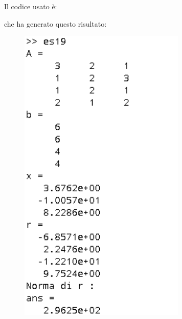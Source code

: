 \label{es319}
\begin{flushleft}
Il codice usato è:

che ha generato questo risultato:
\begin{figure}[h]
\includegraphics[left, width=300px]{cap_3/es19/es319}
\end{figure}
\end{flushleft}
